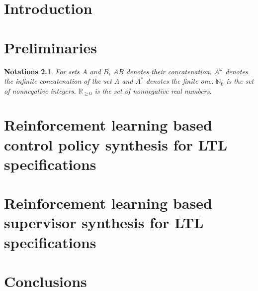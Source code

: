 \documentclass[a4j,12pt,oneside,openany,english,dvipdfmx]{jsbook}
\newtheorem{notations}{Notations}
\begin{document}
\clearpage
\tableofcontents
\clearpage
\setcounter{page}{0}

\chapter{Introduction}



\chapter{Preliminaries}

\begin{notations}
  For sets $A$ and $B$, $AB$ denotes their concatenation. $A^{\omega}$ denotes the infinite concatenation of the set $A$ and $A^{\ast}$ denotes the finite one. $\mathbb{N}_0$ is the set of nonnegative integers. $\mathbb{R}_{\geq 0}$ is the set of nonnegative real numbers.
\end{notations}



\chapter{Reinforcement learning based control policy synthesis for LTL specifications}



\chapter{Reinforcement learning based supervisor synthesis for LTL specifications}



\chapter{Conclusions}



\appendix
\end{document}
